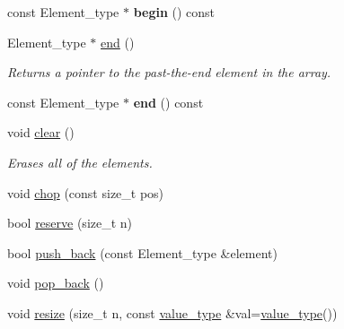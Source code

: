 \begin{DoxyCompactItemize}
\mbox{\label{classMem__root__array__YY_a867fe230010fddefa175438ae973e87e}} 
const Element\+\_\+type $\ast$ {\bfseries begin} () const
\item 
\mbox{\label{classMem__root__array__YY_a87d1b244bc43cf49b75ee8f08e487752}} 
Element\+\_\+type $\ast$ \mbox{\hyperlink{classMem__root__array__YY_a87d1b244bc43cf49b75ee8f08e487752}{end}} ()
\begin{DoxyCompactList}\small\item\em Returns a pointer to the past-\/the-\/end element in the array. \end{DoxyCompactList}\item 
\mbox{\label{classMem__root__array__YY_a305bcad94918a119a3ba42c350f95cbe}} 
const Element\+\_\+type $\ast$ {\bfseries end} () const
\item 
\mbox{\label{classMem__root__array__YY_ac2f2a0fd264d54ebfb44dd74bd6a8361}} 
void \mbox{\hyperlink{classMem__root__array__YY_ac2f2a0fd264d54ebfb44dd74bd6a8361}{clear}} ()
\begin{DoxyCompactList}\small\item\em Erases all of the elements. \end{DoxyCompactList}\item 
void \mbox{\hyperlink{classMem__root__array__YY_ae8180a30bba47eaf409351f33c1b7f1b}{chop}} (const size\+\_\+t pos)
\item 
bool \mbox{\hyperlink{classMem__root__array__YY_ac1538b675c5ef3b9cbe67940b054cc2f}{reserve}} (size\+\_\+t n)
\item 
bool \mbox{\hyperlink{classMem__root__array__YY_ad179b3f709bb4b31d3fce461e93be3cf}{push\+\_\+back}} (const Element\+\_\+type \&element)
\item 
void \mbox{\hyperlink{classMem__root__array__YY_aa07dcb7f72b3b2bba7a46985505fed95}{pop\+\_\+back}} ()
\item 
void \mbox{\hyperlink{classMem__root__array__YY_aee9a24954393d15680f23e59e9eb5f45}{resize}} (size\+\_\+t n, const \mbox{\hyperlink{classMem__root__array__YY_a7cd544d399ee0cf1ac196fbf0da8b3ff}{value\+\_\+type}} \&val=\mbox{\hyperlink{classMem__root__array__YY_a7cd544d399ee0cf1ac196fbf0da8b3ff}{value\+\_\+type}}())
\item 
\mbox{\label{classMem__root__array__YY_a8dec5cb843baa4e450b115bec42b1d26}} 

\end{DoxyCompactItemize}
